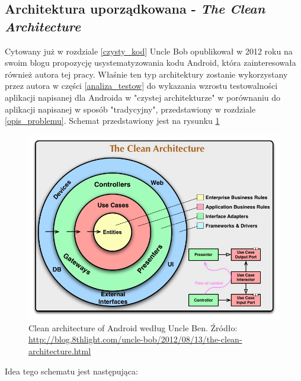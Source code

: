 \subsection{Architektura uporządkowana - \textit{The Clean Architecture}}
\label{clean_architecture_opis}
Cytowany już w rozdziale \ref{czysty_kod} Uncle Bob opublikował w 2012 roku na swoim blogu propozycję usystematyzowania kodu Android, która zainteresowała również autora tej pracy. Właśnie ten typ architektury zostanie wykorzystany przez autora w części \ref{analiza_testow} do wykazania wzrostu testowalności aplikacji napisanej dla Androida w "czystej architekturze" w porównaniu do aplikacji napisanej w sposób "tradycyjny", przedstawiony w rozdziale \ref{opis_problemu}. Schemat przedstawiony jest na rysunku \ref{fig:clean_architecture}

\begin{figure}[!htb]
    \centering
    \includegraphics[width=13cm]{imgs/ch4_clean_architecture.jpg}
    \caption
{Clean architecture of Android według Uncle Ben. Źródło: \url{http://blog.8thlight.com/uncle-bob/2012/08/13/the-clean-architecture.html}}
    \label{fig:clean_architecture}
\end{figure} 

Idea tego schematu jest następująca:

